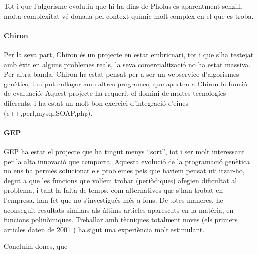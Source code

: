 Tot i que l'algorisme evolutiu que hi ha dins de Pholus és aparentment senzill,
molta complexitat vé donada pel context químic molt complex en el que es troba.

\paragraph{Chiron} %
\label{par:Chiron}

Per la seva part, Chiron és un projecte en estat embrionari, tot i que s'ha testejat amb
èxit en alguns problemes reals, la seva comercialització no ha estat massiva.
Per altra banda, Chiron ha estat pensat per a ser un webservice d'algorismes genètics,
i es pot enllaçar amb altres programes, que aporten a Chiron la funció de
evaluació.  Aquest projecte ha requerit el domini de moltes tecnologíes
diferents, i ha estat un molt bon exercici d'integració d'eines
(c++,perl,mysql,SOAP,php).

\paragraph{GEP} %
\label{par:GEP}
GEP ha estat el projecte que ha tingut menys ``sort'', tot i ser molt
interessant per la alta innovació que comporta.  Aquesta evolució de la programació
genètica no ens ha permès solucionar els problemes pels que haviem pensat
utilitzar-ho, degut a que les funcions que volíem trobar (periòdiques) afegien
dificultat al problema, i tant la falta de temps, com alternatives que s'han
trobat en l'empresa, han fet que no s'investigués més a fons.  De totes maneres,
he aconseguit resultats similars als últims articles aparescuts en la matèria,
en funcions polinòmiques.  Treballar amb tècniques totalment noves (els primers
articles daten de 2001 \cite{ferreira:2001} ) ha sigut una experiència molt
estimulant.

Concluim doncs, que 



